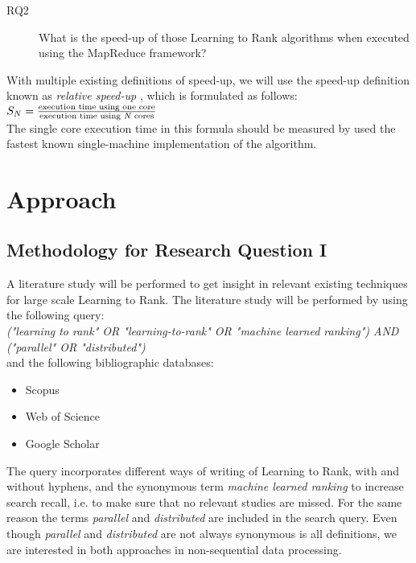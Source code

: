 \begin{description}
\item[RQ2] What is the speed-up of those Learning to Rank algorithms when executed using the MapReduce framework?
\end{description}
\bigskip
With multiple existing definitions of speed-up, we will use the speed-up definition known as \emph{relative speed-up} \cite{Sun1991}, which is formulated as follows:\\

$S_N = \frac{\text{execution time using one core}}{\text{execution time using \emph{N} cores}}$\\

The single core execution time in this formula should be measured by used the fastest known single-machine implementation of the algorithm.

\section{Approach}
\subsection{Methodology for Research Question I}
A literature study will be performed to get insight in relevant existing techniques for large scale Learning to Rank. The literature study will be performed by using the following query:\\

\emph{("learning to rank" \emph{OR} "learning-to-rank" \emph{OR} "machine learned ranking") \emph{AND} ("parallel" \emph{OR} "distributed")}\\

and the following bibliographic databases:
\begin{itemize}
\item Scopus
\item Web of Science
\item Google Scholar
\end{itemize}

The query incorporates different ways of writing of Learning to Rank, with and without hyphens, and the synonymous term \emph{machine learned ranking} to increase search recall, i.e. to make sure that no relevant studies are missed. For the same reason the terms \emph{parallel} and \emph{distributed} are included in the search query. Even though \emph{parallel} and \emph{distributed} are not always synonymous is all definitions, we are interested in both approaches in non-sequential data processing.\\

